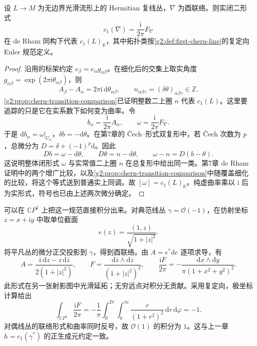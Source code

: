 \begin{proposition}\label{g2:prop:chern-weil-line-normalization}
	设 \(L\to M\) 为无边界光滑流形上的 Hermitian 复线丛，\(\nabla\) 为酉联络。则实闭二形式
	\begin{equation}\label{g2:eq:chern-line-curvature}
		c_1(\nabla)=\frac{\mathrm i}{2\pi}F_\nabla
	\end{equation}
	在 de Rham 同构下代表 \(c_1(L)_{\mathbb R}\)，其中拓扑类按\cref{g2:def:first-chern-line}的复定向 Euler 规范定义。
\end{proposition}
\begin{proof}
	沿用的标架约定 \(e_\beta=e_\alpha g_{\alpha\beta}\)。在细化后的交集上取实角度 \(g_{\alpha\beta}=\exp(2\pi\mathrm i\theta_{\alpha\beta})\)，则
	\[
		A_\beta-A_\alpha=2\pi\mathrm i\,\mathrm d\theta_{\alpha\beta},\qquad
		n_{\alpha\beta\gamma}=(\delta\theta)_{\alpha\beta\gamma}\in\mathbb Z.
	\]
	\cref{g2:prop:chern-transition-comparison}已证明整数二上圈 \(n\) 代表 \(c_1(L)\)。这里要追踪的只是它在实系数下如何变为曲率。令
	\[
		b_\alpha=\frac{\mathrm i}{2\pi}A_\alpha,\qquad
		\omega=\frac{\mathrm i}{2\pi}F_\nabla.
	\]
	于是 \(\mathrm db_\alpha=\omega|_{U_\alpha}\)，\(\delta b=-\mathrm d\theta\)。在第7章的 Čech--形式双复形中，若 Čech 次数为 \(p\)，总微分为 \(D=\delta+(-1)^p\mathrm d\)。因此
	\[
		D b=\omega-\mathrm d\theta,\qquad D\theta=n-\mathrm d\theta,
		\qquad \omega-n=D(b-\theta).
	\]
	这说明整体闭形式 \(\omega\) 与实常值二上圈 \(n\) 在总复形中给出同一类。第7章 de Rham 证明中的两个增广比较，以及\cref{g2:prop:chern-transition-comparison}中随覆盖细化的比较，将这个等式送到普通实上同调。故 \([\omega]=c_1(L)_{\mathbb R}\)。纯虚曲率乘以 \(\mathrm i\) 后为实形式，符号也已由上述两次微分确定。
\end{proof}

可以在 \(\mathbb CP^1\) 上把这一规范直接积分出来。对典范线丛 \(\gamma=\mathcal O(-1)\)，在仿射坐标 \(z=x+\mathrm i y\) 中取单位截面
\[
	e(z)=\frac{(1,z)}{\sqrt{1+|z|^2}}.
\]
将平凡丛的微分正交投影到 \(\gamma\)，得到酉联络。由 \(A=e^*\mathrm de\) 逐项求导，有
\begin{equation}\label{g2:eq:tautological-line-curvature}
	A=\frac{\overline z\,\mathrm dz-z\,\mathrm d\overline z}{2(1+|z|^2)},\qquad
	F=\frac{\mathrm d\overline z\wedge\mathrm dz}{(1+|z|^2)^2},\qquad
	\frac{\mathrm iF}{2\pi}=-\frac{\mathrm dx\wedge\mathrm dy}{\pi(1+x^2+y^2)^2}.
\end{equation}
此形式在另一张射影图中光滑延拓；无穷远点对积分无贡献。采用复定向，极坐标计算给出
\[
	\int_{\mathbb CP^1}\frac{\mathrm iF}{2\pi}
	=-\frac1\pi\int_0^{2\pi}\!\int_0^\infty\frac{r}{(1+r^2)^2}\,\mathrm dr\,\mathrm d\varphi=-1.
\]
对偶线丛的联络形式和曲率同时反号，故 \(\mathcal O(1)\) 的积分为 \(1\)。这与上一章 \(h=c_1(\gamma^*)\) 的正生成元约定一致。

